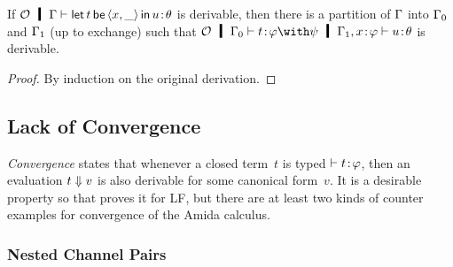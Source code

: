  \begin{proposition}
  \label{inv-with-l}
  If $\hypert\hmid \G\tr\tj{\letin t {\lpair{x,\_}} u}\theta$
  is derivable, then there is a partition of $\Gamma$ into $\Gamma_0$ and $\Gamma_1$
  (up to exchange) such that $\hypert\hmid \G_0\tr \tj t {\phi\with\psi}
  \hmid \G_1,\tj{x}{\phi}\tr\tj u \theta$ is derivable.
 \end{proposition}
 \begin{proof}
   By induction on the original derivation.
 \end{proof}

  \subsection{Lack of Convergence}

  \textit{Convergence} states that whenever a closed
  term~$t$ is typed $\vdash{t} \mathord{\colon\kern -2pt}{\varphi}$, then an evaluation $t\Downarrow v$ is also derivable for some
  canonical form~$v$.
  It is a desirable property so that \citet{abramsky1993computational}
  proves it for LF, but
  there are at least two kinds of counter examples for
  convergence of the Amida calculus.

\subsubsection{Nested Channel Pairs}
\label{eval-subst}

